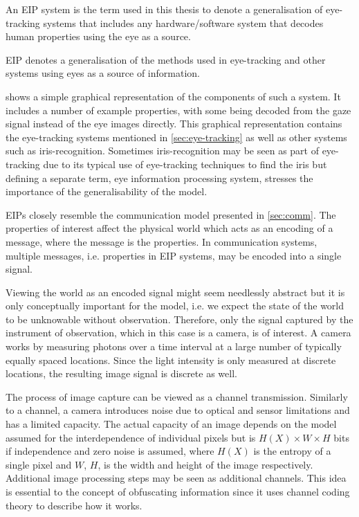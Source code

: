 An EIP system is the term used in this thesis to denote a generalisation of eye-tracking systems that includes any hardware/software system that decodes human properties using the eye as a source. 

\begin{definition}
	EIP denotes a generalisation of the methods used in eye-tracking and other systems using eyes as a source of information. 
\end{definition}

 shows a simple graphical representation of the components of such a system. It includes a number of example properties, with some being decoded from the gaze signal instead of the eye images directly. This graphical representation contains the eye-tracking systems mentioned in \cref{sec:eye-tracking} as well as other systems such as iris-recognition. Sometimes iris-recognition may be seen as part of eye-tracking due to its typical use of eye-tracking techniques to find the iris but defining a separate term, eye information processing system, stresses the importance of the generalisability of the model.

EIPs closely resemble the communication model presented in \cref{sec:comm}. The properties of interest affect the physical world which acts as an encoding of a message, where the message is the properties. In communication systems, multiple messages, i.e. properties in EIP systems, may be encoded into a single signal. 


Viewing the world as an encoded signal might seem needlessly abstract but it is only conceptually important for the model, i.e. we expect the state of the world to be unknowable without observation. Therefore, only the signal captured by the instrument of observation, which in this case is a camera, is of interest. A camera works by measuring photons over a time interval at a large number of typically equally spaced locations. Since the light intensity is only measured at discrete locations, the resulting image signal is discrete as well. 

The process of image capture can be viewed as a channel transmission. Similarly to a channel, a camera introduces noise due to optical and sensor limitations and has a limited capacity. The actual capacity of an image depends on the model assumed for the interdependence of individual pixels but is $H(X)\times W\times H$ bits if independence and zero noise is assumed, where $H(X)$ is the entropy of a single pixel and $W$, $H$, is the width and height of the image respectively. Additional image processing steps may be seen as additional channels. This idea is essential to the concept of obfuscating information since it uses channel coding theory to describe how it works. 

